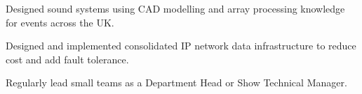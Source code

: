 {}
\begin{tightemize}
  \item Designed sound systems using CAD modelling and array processing knowledge for events across the UK.
  \item Designed and implemented consolidated IP network data infrastructure to reduce cost and add fault tolerance.
  \item Regularly lead small teams as a Department Head or Show Technical Manager.
\end{tightemize}
\sectionsep
